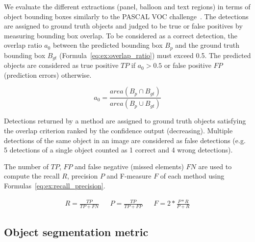 We evaluate the different extractions (panel, balloon and text regions) in terms of object bounding boxes similarly to the PASCAL VOC challenge~\cite{everingham2010pascal}.
The detections are assigned to ground truth objects and judged to be true or false positives by measuring bounding box overlap.
To be considered as a correct detection, the overlap ratio $a_0$ between the predicted bounding box $B_p$ and the ground truth bounding box $B_{gt}$ (Formula~\ref{eq:ex:overlap_ratio}) must exceed 0.5.
The predicted objects are considered as true positive $TP$ if $a_0 > 0.5$ or false positive $FP$ (prediction errors) otherwise.

\begin{equation}
\label{eq:ex:overlap_ratio}
  a_0 = \frac{area(B_p \cap B_{gt})}{area(B_p \cup B_{gt})}
\end{equation}

Detections returned by a method are assigned to ground truth objects satisfying the overlap criterion ranked by the confidence output (decreasing).
Multiple detections of the same object in an image are considered as false detections (e.g. 5 detections of a single object counted as 1 correct and 4 wrong detections).

The number of $TP$, $FP$ and false negative (missed elements) $FN$ are used to compute the recall $R$, precision $P$ and F-measure $F$ of each method using Formulas~\ref{eq:ex:recall_precision}.

\begin{align}
\label{eq:ex:recall_precision}
R = \frac{TP}{TP + FN} && P = \frac{TP}{TP + FP} && F = 2 * \frac{P * R}{P + R}
\end{align}




\subsection{Object segmentation metric} %
\label{sub:ex:object_segmentation_metric}

